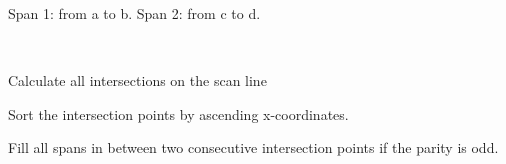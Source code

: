 \begin{compactdesc}
\item[\lp{Spans}]
Span 1: from a to b. Span 2: from c to d.
\item[\lp{Algorithm}]\hfill \\
\begin{enumerate*}[label=\protect\circled{\arabic*},itemjoin=]
	\item Calculate all intersections on the scan line\\
	\item Sort the intersection points by ascending x-coordinates.\\
	\item Fill all spans in between two consecutive intersection points if the parity is odd.
\end{enumerate*}
\end{compactdesc}
